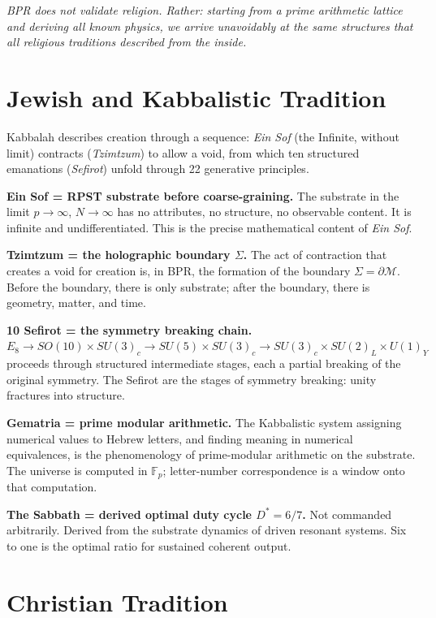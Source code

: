 \documentclass[12pt,oneside]{book}
\theoremstyle{definition}
\newcommand{\EEight}{E_8}
\begin{document}
\epigraph{\itshape BPR does not validate religion. Rather: starting from a prime
arithmetic lattice and deriving all known physics, we arrive unavoidably at the
same structures that all religious traditions described from the inside.}{}

\section{Jewish and Kabbalistic Tradition}

Kabbalah describes creation through a sequence: \textit{Ein Sof} (the Infinite,
without limit) contracts (\textit{Tzimtzum}) to allow a void, from which ten
structured emanations (\textit{Sefirot}) unfold through 22 generative principles.

\medskip
\noindent\textbf{Ein Sof = RPST substrate before coarse-graining.}
The substrate in the limit $p\to\infty$, $N\to\infty$ has no attributes, no
structure, no observable content. It is infinite and undifferentiated. This is the
precise mathematical content of \textit{Ein Sof}.

\noindent\textbf{Tzimtzum = the holographic boundary $\Sigma$.}
The act of contraction that creates a void for creation is, in BPR, the formation
of the boundary $\Sigma = \partial\mathcal{M}$. Before the boundary, there is only
substrate; after the boundary, there is geometry, matter, and time.

\noindent\textbf{10 Sefirot = the symmetry breaking chain.}
$\EEight \to SO(10)\times SU(3)_c \to SU(5)\times SU(3)_c \to SU(3)_c\times
SU(2)_L\times U(1)_Y$ proceeds through structured intermediate stages, each a
partial breaking of the original symmetry. The Sefirot are the stages of symmetry
breaking: unity fractures into structure.

\noindent\textbf{Gematria = prime modular arithmetic.}
The Kabbalistic system assigning numerical values to Hebrew letters, and finding
meaning in numerical equivalences, is the phenomenology of prime-modular arithmetic
on the substrate. The universe is computed in $\mathbb{F}_p$; letter-number
correspondence is a window onto that computation.

\noindent\textbf{The Sabbath = derived optimal duty cycle $D^* = 6/7$.}
Not commanded arbitrarily. Derived from the substrate dynamics of driven resonant
systems. Six to one is the optimal ratio for sustained coherent output.

\section{Christian Tradition}
\end{document}
